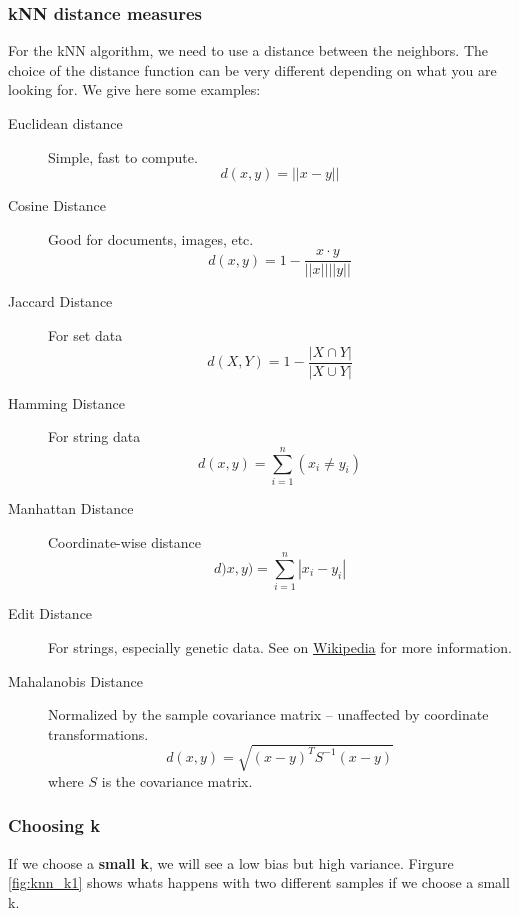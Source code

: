 \subsubsection{kNN distance measures}
For the kNN algorithm, we need to use a distance between the neighbors. The choice of the distance function can be very different depending on what you are looking for. We give here some examples:
\begin{description}
 \item[Euclidean distance] Simple, fast to compute.
 \[
  d(x,y) = ||x-y||
 \]

 \item[Cosine Distance] Good for documents, images, etc.
 \[
  d(x,y) = 1- \frac{x\cdot y}{||x||||y||}
 \]

 \item[Jaccard Distance] For set data
 \[
  d(X,Y) = 1 - \frac{|X \cap Y|}{|X \cup Y|}
 \]

 \item[Hamming Distance] For string data
 \[
  d(x,y) = \sum_{i=1}^{n} \left( x_i \neq y_i \right)
 \]
 \item[Manhattan Distance] Coordinate-wise distance
 \[
  d)x,y) = \sum_{i=1}^n |x_i - y_i|
 \]
 \item[Edit Distance] For strings, especially genetic data. See on \href{https://en.wikipedia.org/wiki/Edit\_distance}{Wikipedia} for more information.
 \item[Mahalanobis Distance] Normalized by the sample covariance matrix -- unaffected by coordinate transformations. 
 \[
  d(x,y) = \sqrt{\left(x-y\right)^TS^{-1}\left(x-y\right)}
 \]
 where $S$ is the covariance matrix.
\end{description}

\subsubsection{Choosing k}

If we choose a {\bf small k}, we will see a low bias but high variance. Firgure \ref{fig:knn_k1} shows whats happens with two different samples if we choose a small k.


